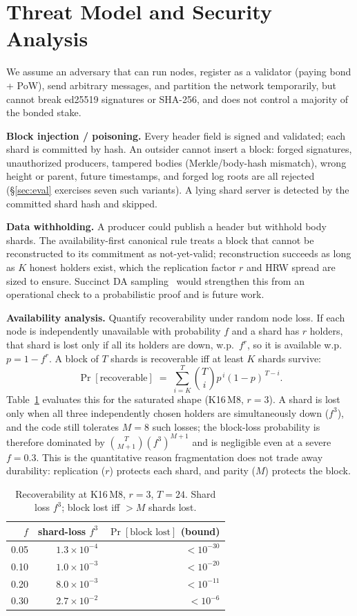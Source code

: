 \section{Threat Model and Security Analysis}
\label{sec:threat}
We assume an adversary that can run nodes, register as a validator (paying bond + PoW), send
arbitrary messages, and partition the network temporarily, but cannot break ed25519 signatures
or SHA-256, and does not control a majority of the bonded stake.

\textbf{Block injection / poisoning.} Every header field is signed and validated; each shard is
committed by hash. An outsider cannot insert a block: forged signatures, unauthorized producers,
tampered bodies (Merkle/body-hash mismatch), wrong height or parent, future timestamps, and
forged log roots are all rejected (\S\ref{sec:eval} exercises seven such variants). A lying shard
server is detected by the committed shard hash and skipped.

\textbf{Data withholding.} A producer could publish a header but withhold body shards. The
availability-first canonical rule treats a block that cannot be reconstructed to its commitment
as not-yet-valid; reconstruction succeeds as long as $K$ honest holders exist, which the
replication factor $r$ and HRW spread are sized to ensure. Succinct DA
sampling~\cite{hallandersen2025foundations} would strengthen this from an operational check to a
probabilistic proof and is future work.

\textbf{Availability analysis.} Quantify recoverability under random node loss. If each node is
independently unavailable with probability $f$ and a shard has $r$ holders, that shard is lost
only if all its holders are down, w.p.\ $f^r$, so it is available w.p.\ $p=1-f^r$. A block of $T$
shards is recoverable iff at least $K$ shards survive:
\[
\Pr[\text{recoverable}] \;=\; \sum_{i=K}^{T}\binom{T}{i}p^{\,i}(1-p)^{\,T-i}.
\]
Table~\ref{tab:avail} evaluates this for the saturated shape (K16\,M8, $r{=}3$). A shard is lost
only when all three independently chosen holders are simultaneously down ($f^3$), and the code
still tolerates $M{=}8$ such losses; the block-loss probability is therefore dominated by
$\binom{T}{M+1}(f^3)^{M+1}$ and is negligible even at a severe $f{=}0.3$. This is the quantitative
reason fragmentation does not trade away durability: replication ($r$) protects each shard, and
parity ($M$) protects the block.

\begin{table}[t]
\centering
\caption{Recoverability at K16\,M8, $r{=}3$, $T{=}24$. Shard loss $f^3$; block lost iff $>M$ shards lost.}
\label{tab:avail}
\small
\begin{tabular}{rrr}
\toprule
$f$ & shard-loss $f^3$ & $\Pr[\text{block lost}]$ (bound) \\
\midrule
0.05 & $1.3\times10^{-4}$ & $<10^{-30}$ \\
0.10 & $1.0\times10^{-3}$ & $<10^{-20}$ \\
0.20 & $8.0\times10^{-3}$ & $<10^{-11}$ \\
0.30 & $2.7\times10^{-2}$ & $<10^{-6}$ \\
\bottomrule
\end{tabular}
\end{table}

